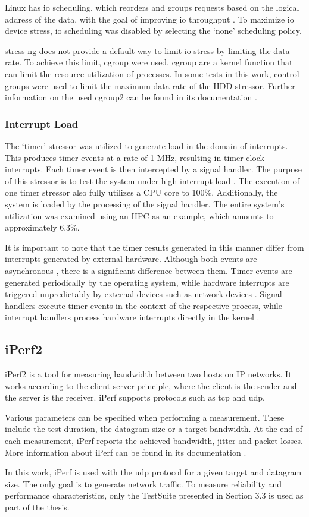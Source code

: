 Linux has \ac{io} scheduling, which reorders and groups requests based on the logical address of the data, with the goal of improving \ac{io} throughput \cite{stress10}. To maximize \ac{io} device stress, \ac{io} scheduling was disabled by selecting the `none' scheduling policy.

stress-ng does not provide a default way to limit \ac{io} stress by limiting the data rate. To achieve this limit, \ac{cgroup} were used. \ac{cgroup} are a kernel function that can limit the resource utilization of processes. In some tests in this work, control groups were used to limit the maximum data rate of the HDD stressor. Further information on the used cgroup2 can be found in its documentation \cite{stress11}.

\subsubsection{Interrupt Load} \label{chap:stressngInterrupt}
The `timer' stressor was utilized to generate load in the domain of interrupts. This produces timer events at a rate of 1 MHz, resulting in timer clock interrupts. Each timer event is then intercepted by a signal handler. The purpose of this stressor is to test the system under high interrupt load \cite{stress02}. The execution of one timer stressor also fully utilizes a \ac{CPU} core to 100\%. Additionally, the system is loaded by the processing of the signal handler. The entire system's utilization was examined using an HPC as an example, which amounts to approximately 6.3\%.

It is important to note that the timer results generated in this manner differ from interrupts generated by external hardware. Although both events are asynchronous \cite{like02}, there is a significant difference between them. Timer events are generated periodically by the operating system, while hardware interrupts are triggered unpredictably by external devices such as network devices \cite{stress14}. Signal handlers execute timer events in the context of the respective process, while interrupt handlers process hardware interrupts directly in the kernel \cite{like02}.




\subsection{iPerf2}
iPerf2 is a tool for measuring bandwidth between two hosts on IP networks. It works according to the client-server principle, where the client is the sender and the server is the receiver. iPerf supports protocols such as \ac{tcp} and \ac{udp}.

Various parameters can be specified when performing a measurement. These include the test duration, the datagram size or a target bandwidth. At the end of each measurement, iPerf reports the achieved bandwidth, jitter and packet losses. More information about iPerf can be found in its documentation \cite{testsuite01}.

In this work, iPerf is used with the \ac{udp} protocol for a given target and datagram size. The only goal is to generate network traffic. To measure reliability and performance characteristics, only the TestSuite presented in Section 3.3 is used as part of the thesis.